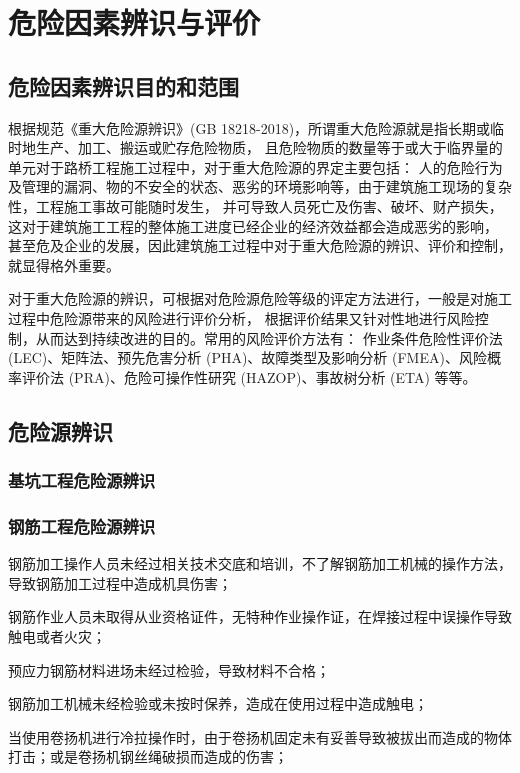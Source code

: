 \section{危险因素辨识与评价}

\subsection{危险因素辨识目的和范围}

根据规范《重大危险源辨识》(GB 18218-2018)，所谓重大危险源就是指长期或临时地生产、加工、搬运或贮存危险物质，
且危险物质的数量等于或大于临界量的单元对于路桥工程施工过程中，对于重大危险源的界定主要包括：
人的危险行为及管理的漏洞、物的不安全的状态、恶劣的环境影响等，由于建筑施工现场的复杂性，工程施工事故可能随时发生，
并可导致人员死亡及伤害、破坏、财产损失，这对于建筑施工工程的整体施工进度已经企业的经济效益都会造成恶劣的影响，
甚至危及企业的发展，因此建筑施工过程中对于重大危险源的辨识、评价和控制，就显得格外重要。

对于重大危险源的辨识，可根据对危险源危险等级的评定方法进行，一般是对施工过程中危险源带来的风险进行评价分析，
根据评价结果又针对性地进行风险控制，从而达到持续改进的目的。常用的风险评价方法有：
作业条件危险性评价法(LEC)、矩阵法、预先危害分析 (PHA)、故障类型及影响分析 (FMEA)、风险概率评价法 (PRA)、危险可操作性研究 (HAZOP)、事故树分析 (ETA) 等等。

\subsection{危险源辨识}
\subsubsection{基坑工程危险源辨识}
\subsubsection{钢筋工程危险源辨识}

 钢筋加工操作人员未经过相关技术交底和培训，不了解钢筋加工机械的操作方法，导致钢筋加工过程中造成机具伤害；

 钢筋作业人员未取得从业资格证件，无特种作业操作证，在焊接过程中误操作导致触电或者火灾；

 预应力钢筋材料进场未经过检验，导致材料不合格；

 钢筋加工机械未经检验或未按时保养，造成在使用过程中造成触电；

 当使用卷扬机进行冷拉操作时，由于卷扬机固定未有妥善导致被拔出而造成的物体打击；或是卷扬机钢丝绳破损而造成的伤害；

